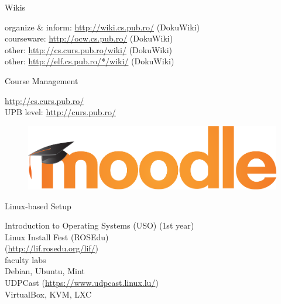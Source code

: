 \documentclass{paper}
\begin{document}
\begin{frame}{Wikis}
  \begin{center}
    {\Large
      \pause organize \& inform: \url{http://wiki.cs.pub.ro/} (DokuWiki) \\
      \vspace{0.3cm}
      \pause courseware: \url{http://ocw.cs.pub.ro/} (DokuWiki) \\
      \vspace{0.3cm}
      \pause other: \url{http://cs.curs.pub.ro/wiki/} (DokuWiki) \\
      \vspace{0.3cm}
      \pause other: \url{http://elf.cs.pub.ro/*/wiki/} (DokuWiki)
    }
  \end{center}
\end{frame}

\begin{frame}{Course Management}
  \begin{center}
    {\Large
      \pause \url{http://cs.curs.pub.ro/} \\
      \vspace{0.3cm}
      \pause UPB level: \url{http://curs.pub.ro/}
      \vspace{0.3cm}
    }
  \pause
  \end{center}
  \begin{figure}
    \centering
      \includegraphics[width=0.6\linewidth]{img/moodle-logo} \\
  \end{figure}
\end{frame}

\begin{frame}{Linux-based Setup}
  \begin{center}
    \pause Introduction to Operating Systems (USO) (1st year) \\
    \vspace{0.3cm}
    \pause Linux Install Fest (ROSEdu)\\
    (\url{http://lif.rosedu.org/lif/}) \\
    \vspace{0.3cm}
    \pause faculty labs \\
    \vspace{0.3cm}
    \pause Debian, Ubuntu, Mint \\
    \vspace{0.3cm}
    \pause UDPCast (\url{https://www.udpcast.linux.lu/}) \\
    \vspace{0.3cm}
    \pause VirtualBox, KVM, LXC
  \end{center}
\end{frame}
\end{document}
